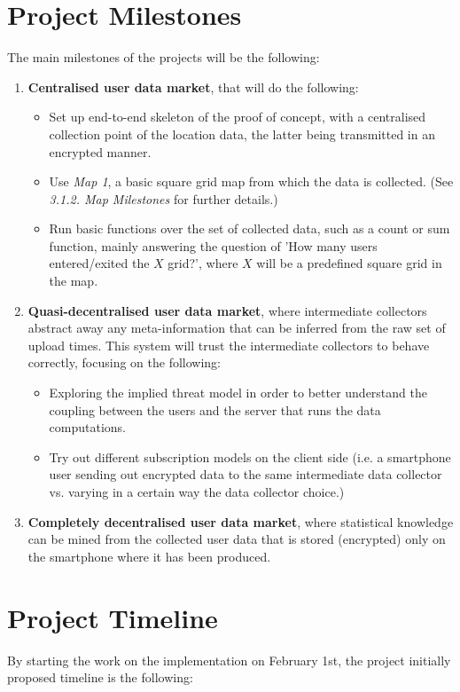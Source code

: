 \section{Project Milestones}
The main milestones of the projects will be the following:
\begin{enumerate}
\item \textbf{Centralised user data market}, that will do the following:
	\begin{itemize}
    \item Set up end-to-end skeleton of the proof of concept, with a centralised collection point of the location data, the latter being transmitted in an encrypted manner.
    \item Use \textit{Map 1}, a basic square grid map from which the data is collected. (See \textit{3.1.2. Map Milestones} for further details.)
    \item Run basic functions over the set of collected data, such as a count or sum function, mainly answering the question of 'How many users entered/exited the $X$ grid?', where $X$ will be a predefined square grid in the map.\end{itemize}
\item \textbf{Quasi-decentralised user data market}, where intermediate collectors abstract away any meta-information that can be inferred from the raw set of upload times. This system will trust the intermediate collectors to behave correctly, focusing on the following:
\begin{itemize}
\item Exploring the implied threat model in order to better understand the coupling between the users and the server that runs the data computations.
\item Try out different subscription models on the client side (i.e. a smartphone user sending out encrypted data to the same intermediate data collector vs. varying in a certain way the data collector choice.)
\end{itemize}
\item \textbf{Completely decentralised user data market}, where statistical knowledge can be mined from the collected user data that is stored (encrypted) only on the smartphone where it has been produced.
\end{enumerate}

\section{Project Timeline}
By starting the work on the implementation on February 1st, the project initially proposed timeline is the following:

